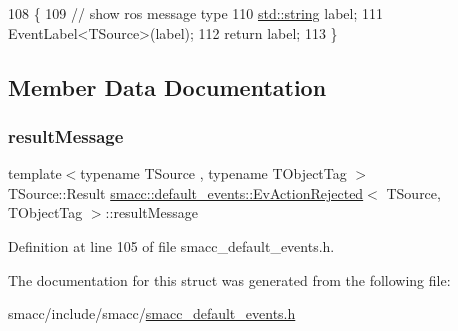 \begin{DoxyCode}
108   \{
109     \textcolor{comment}{// show ros message type}
110     \hyperlink{namespacetesting_1_1internal_a8e8ff5b11e64078831112677156cb111}{std::string} label;
111     EventLabel<TSource>(label);
112     \textcolor{keywordflow}{return} label;
113   \}
\end{DoxyCode}


\subsection{Member Data Documentation}
\mbox{\label{structsmacc_1_1default__events_1_1EvActionRejected_a40b6bcf337a76104499c82d0c4d5a49f}} 
\subsubsection{\texorpdfstring{result\+Message}{resultMessage}}
{\footnotesize\ttfamily template$<$typename T\+Source , typename T\+Object\+Tag $>$ \\
T\+Source\+::\+Result \hyperlink{structsmacc_1_1default__events_1_1EvActionRejected}{smacc\+::default\+\_\+events\+::\+Ev\+Action\+Rejected}$<$ T\+Source, T\+Object\+Tag $>$\+::result\+Message}



Definition at line 105 of file smacc\+\_\+default\+\_\+events.\+h.



The documentation for this struct was generated from the following file\+:\begin{DoxyCompactItemize}
\item 
smacc/include/smacc/\hyperlink{smacc__default__events_8h}{smacc\+\_\+default\+\_\+events.\+h}\end{DoxyCompactItemize}
